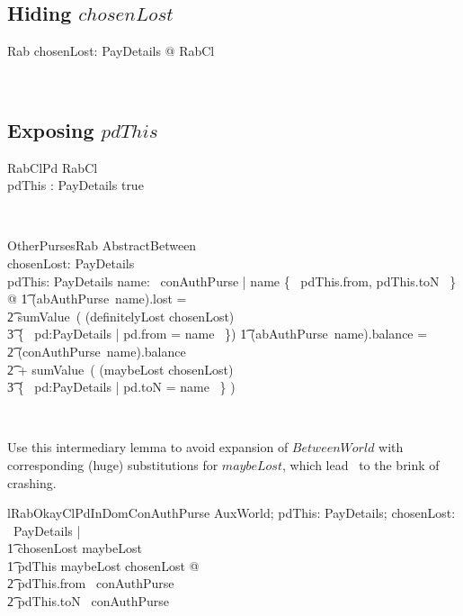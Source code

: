 \subsection{Hiding $chosenLost$}

\begin{LSDef}
\begin{zed}
  Rab  \exists chosenLost: \power PayDetails @ RabCl
\end{zed}~\end{LSDef}

\subsection{Exposing $pdThis$}

\begin{LSDef}
\begin{schema}{RabClPd}
  RabCl
  \\ %
  pdThis : PayDetails
\where
  true
\end{schema}~\end{LSDef}

\begin{LSDef}
\begin{schema}{OtherPursesRab}
  AbstractBetween
  \\ %
  chosenLost: \power PayDetails
  \\ %
  pdThis: PayDetails
\where %
  \forall name: \dom~conAuthPurse | name \notin \{~ pdThis.from, pdThis.toN ~\} @
  \also %
  \t1 (abAuthPurse~name).lost =
  \\ %
  \t2 sumValue~( (definitelyLost \cup chosenLost)
  \\ %
  \t3 {} \cap \{~ pd:PayDetails | pd.from = name ~\})
  \also %
  \t1 \land (abAuthPurse~name).balance =
  \\ %
  \t2 (conAuthPurse~name).balance
  \\ %
  \t2 {} + sumValue~( (maybeLost \setminus chosenLost)
  \\ %
  \t3 {} \cap \{~ pd:PayDetails | pd.toN = name ~\} )
\end{schema}~\end{LSDef}

Use this intermediary lemma to avoid expansion of $BetweenWorld$
with corresponding (huge) substitutions for $maybeLost$, which lead
\zeves\ to the brink of crashing.
%
\begin{LNewLemma}
\begin{theorem}{lRabOkayClPdInDomConAuthPurse}
    \forall AuxWorld; pdThis: PayDetails; chosenLost: \power~PayDetails | \\
        \t1 chosenLost \subseteq maybeLost \\
        \t1 \land pdThis \in maybeLost \setminus chosenLost @ \\
            \t2 pdThis.from \in \dom~conAuthPurse \\
            \t2 \land pdThis.toN \in \dom~conAuthPurse
\end{theorem}~\end{LNewLemma}


